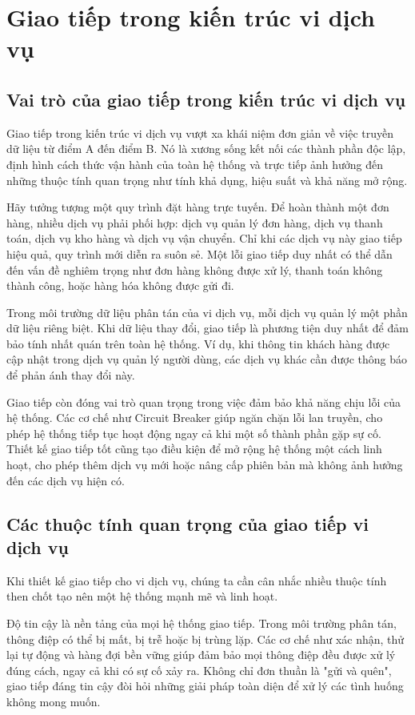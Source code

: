 \section{Giao tiếp trong kiến trúc vi dịch vụ}

\subsection{Vai trò của giao tiếp trong kiến trúc vi dịch vụ}
Giao tiếp trong kiến trúc vi dịch vụ vượt xa khái niệm đơn giản về việc truyền dữ liệu từ điểm A đến điểm B. Nó là xương sống kết nối các thành phần độc lập, định hình cách thức vận hành của toàn hệ thống và trực tiếp ảnh hưởng đến những thuộc tính quan trọng như tính khả dụng, hiệu suất và khả năng mở rộng.

Hãy tưởng tượng một quy trình đặt hàng trực tuyến. Để hoàn thành một đơn hàng, nhiều dịch vụ phải phối hợp: dịch vụ quản lý đơn hàng, dịch vụ thanh toán, dịch vụ kho hàng và dịch vụ vận chuyển. Chỉ khi các dịch vụ này giao tiếp hiệu quả, quy trình mới diễn ra suôn sẻ. Một lỗi giao tiếp duy nhất có thể dẫn đến vấn đề nghiêm trọng như đơn hàng không được xử lý, thanh toán không thành công, hoặc hàng hóa không được gửi đi.

Trong môi trường dữ liệu phân tán của vi dịch vụ, mỗi dịch vụ quản lý một phần dữ liệu riêng biệt. Khi dữ liệu thay đổi, giao tiếp là phương tiện duy nhất để đảm bảo tính nhất quán trên toàn hệ thống. Ví dụ, khi thông tin khách hàng được cập nhật trong dịch vụ quản lý người dùng, các dịch vụ khác cần được thông báo để phản ánh thay đổi này.

Giao tiếp còn đóng vai trò quan trọng trong việc đảm bảo khả năng chịu lỗi của hệ thống. Các cơ chế như Circuit Breaker giúp ngăn chặn lỗi lan truyền, cho phép hệ thống tiếp tục hoạt động ngay cả khi một số thành phần gặp sự cố. Thiết kế giao tiếp tốt cũng tạo điều kiện để mở rộng hệ thống một cách linh hoạt, cho phép thêm dịch vụ mới hoặc nâng cấp phiên bản mà không ảnh hưởng đến các dịch vụ hiện có.

\subsection{Các thuộc tính quan trọng của giao tiếp vi dịch vụ}
Khi thiết kế giao tiếp cho vi dịch vụ, chúng ta cần cân nhắc nhiều thuộc tính then chốt tạo nên một hệ thống mạnh mẽ và linh hoạt.

Độ tin cậy là nền tảng của mọi hệ thống giao tiếp. Trong môi trường phân tán, thông điệp có thể bị mất, bị trễ hoặc bị trùng lặp. Các cơ chế như xác nhận, thử lại tự động và hàng đợi bền vững giúp đảm bảo mọi thông điệp đều được xử lý đúng cách, ngay cả khi có sự cố xảy ra. Không chỉ đơn thuần là "gửi và quên", giao tiếp đáng tin cậy đòi hỏi những giải pháp toàn diện để xử lý các tình huống không mong muốn.

